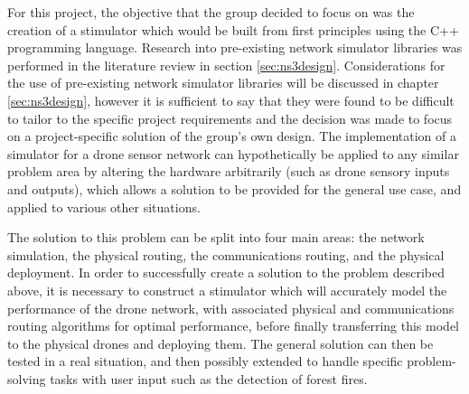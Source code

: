 For this project, the objective that the group decided to focus on was the creation of a stimulator which would be built from first principles using the C++ programming language. Research into pre-existing network simulator libraries was performed in the literature review in section \ref{sec:ns3design}. Considerations for the use of pre-existing network simulator libraries will be discussed in chapter \ref{sec:ns3design}, however it is sufficient to say that they were found to be difficult to tailor to the specific project requirements and the decision was made to focus on a project-specific solution of the group’s own design. The implementation of a simulator for a drone sensor network can hypothetically be applied to any similar problem area by altering the hardware arbitrarily (such as drone sensory inputs and outputs), which allows a solution to be provided for the general use case, and applied to various other situations.

The solution to this problem can be split into four main areas: the network simulation, the physical routing, the communications routing, and the physical deployment. In order to successfully create a solution to the problem described above, it is necessary to construct a stimulator which will accurately model the performance of the drone network, with associated physical and communications routing algorithms for optimal performance, before finally transferring this model to the physical drones and deploying them. The general solution can then be tested in a real situation, and then possibly extended to handle specific problem-solving tasks with user input such as the detection of forest fires. 
